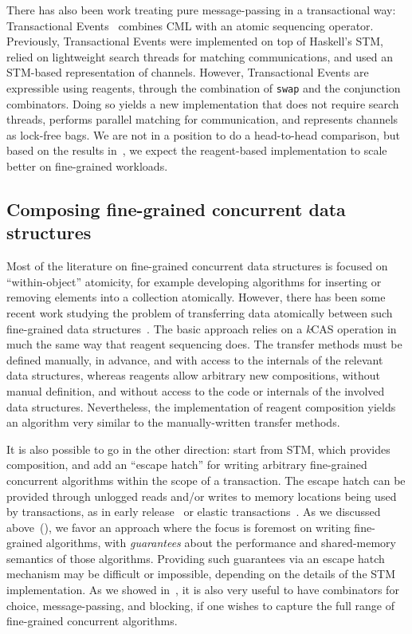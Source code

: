 \documentclass[preprint,nocopyrightspace]{sigplanconf}
\begin{document}
There has also been work treating pure message-passing in a transactional way:
Transactional Events~\cite{Donnelly2006} combines CML with an atomic
sequencing operator.  Previously, Transactional Events were implemented on top
of Haskell's STM, relied on lightweight search threads for matching
communications, and used an STM-based representation of channels.  However,
Transactional Events are expressible using reagents, through the combination
of \lstinline{swap} and the conjunction combinators.  Doing so yields a new
implementation that does not require search threads, performs parallel
matching for communication, and represents channels as lock-free bags.  We are
not in a position to do a head-to-head comparison, but based on the results
in~, we expect the reagent-based implementation to scale
better on fine-grained workloads.

\subsection{Composing fine-grained concurrent data structures}

Most of the literature on fine-grained concurrent data structures is focused
on ``within-object'' atomicity, for example developing algorithms for
inserting or removing elements into a collection atomically.  However, there
has been some recent work studying the problem of transferring data atomically
between such fine-grained data structures~\cite{Cederman2010}.  The basic
approach relies on a \emph{k}CAS operation in much the same way that reagent
sequencing does.  The transfer methods must be defined manually, in advance,
and with access to the internals of the relevant data structures, whereas
reagents allow arbitrary new compositions, without manual definition, and
without access to the code or internals of the involved data structures.
Nevertheless, the implementation of reagent composition yields an algorithm
very similar to the manually-written transfer methods.

It is also possible to go in the other direction: start from STM, which
provides composition, and add an ``escape hatch'' for writing arbitrary
fine-grained concurrent algorithms within the scope of a transaction.  The
escape hatch can be provided through unlogged reads and/or writes to memory
locations being used by transactions, as in early release~\cite{Herlihy2003}
or elastic transactions~\cite{Felber2009}.  As we discussed
above~(), we favor an approach where the focus is foremost on
writing fine-grained algorithms, with \emph{guarantees} about the performance
and shared-memory semantics of those algorithms.  Providing such guarantees
via an escape hatch mechanism may be difficult or impossible, depending on the
details of the STM implementation.  As we showed in~, it is
also very useful to have combinators for choice, message-passing, and
blocking, if one wishes to capture the full range of fine-grained concurrent
algorithms.
\end{document}
